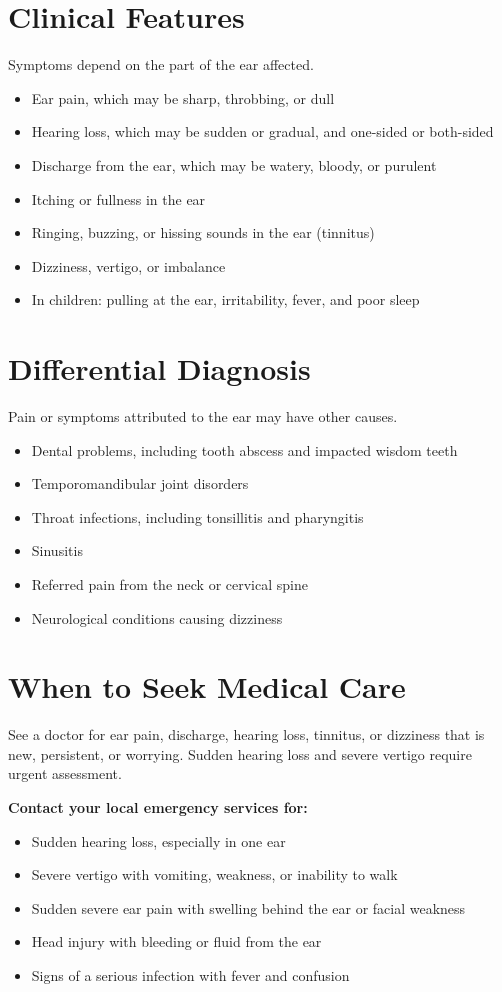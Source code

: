 \section*{Clinical Features}
Symptoms depend on the part of the ear affected.
\begin{itemize}
    \item Ear pain, which may be sharp, throbbing, or dull
    \item Hearing loss, which may be sudden or gradual, and one-sided or both-sided
    \item Discharge from the ear, which may be watery, bloody, or purulent
    \item Itching or fullness in the ear
    \item Ringing, buzzing, or hissing sounds in the ear (tinnitus)
    \item Dizziness, vertigo, or imbalance
    \item In children: pulling at the ear, irritability, fever, and poor sleep
\end{itemize}

\section*{Differential Diagnosis}
Pain or symptoms attributed to the ear may have other causes.
\begin{itemize}
    \item Dental problems, including tooth abscess and impacted wisdom teeth
    \item Temporomandibular joint disorders
    \item Throat infections, including tonsillitis and pharyngitis
    \item Sinusitis
    \item Referred pain from the neck or cervical spine
    \item Neurological conditions causing dizziness
\end{itemize}

\section*{When to Seek Medical Care}
See a doctor for ear pain, discharge, hearing loss, tinnitus, or dizziness that is new, persistent, or worrying. Sudden hearing loss and severe vertigo require urgent assessment.

\textbf{Contact your local emergency services for:}
\begin{itemize}
    \item Sudden hearing loss, especially in one ear
    \item Severe vertigo with vomiting, weakness, or inability to walk
    \item Sudden severe ear pain with swelling behind the ear or facial weakness
    \item Head injury with bleeding or fluid from the ear
    \item Signs of a serious infection with fever and confusion
\end{itemize}

